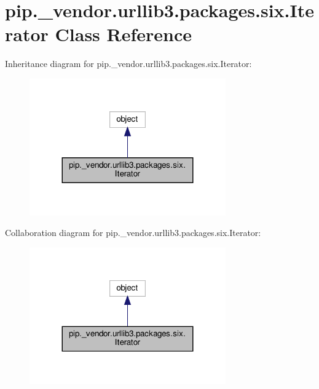 \hypertarget{classpip_1_1__vendor_1_1urllib3_1_1packages_1_1six_1_1Iterator}{}\section{pip.\+\_\+vendor.\+urllib3.\+packages.\+six.\+Iterator Class Reference}
\label{classpip_1_1__vendor_1_1urllib3_1_1packages_1_1six_1_1Iterator}


Inheritance diagram for pip.\+\_\+vendor.\+urllib3.\+packages.\+six.\+Iterator\+:
\nopagebreak
\begin{figure}[H]
\begin{center}
\leavevmode
\includegraphics[width=239pt]{classpip_1_1__vendor_1_1urllib3_1_1packages_1_1six_1_1Iterator__inherit__graph}
\end{center}
\end{figure}


Collaboration diagram for pip.\+\_\+vendor.\+urllib3.\+packages.\+six.\+Iterator\+:
\nopagebreak
\begin{figure}[H]
\begin{center}
\leavevmode
\includegraphics[width=239pt]{classpip_1_1__vendor_1_1urllib3_1_1packages_1_1six_1_1Iterator__coll__graph}
\end{center}
\end{figure}
